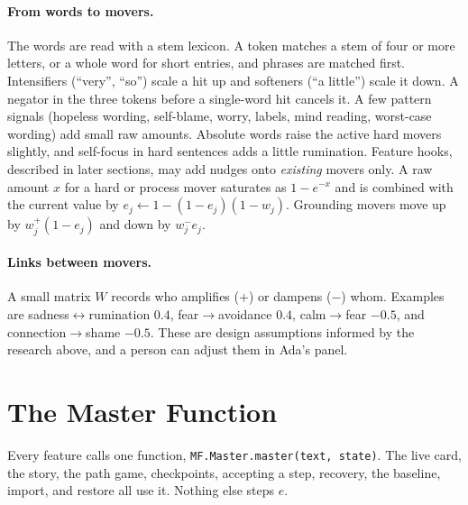 \documentclass[10pt]{article}
\theoremstyle{definition}
\theoremstyle{remark}
\begin{document}
\paragraph{From words to movers.} The words are read with a stem lexicon. A token matches a stem of four or more letters, or a whole word for short entries, and phrases are matched first. Intensifiers (``very'', ``so'') scale a hit up and softeners (``a little'') scale it down. A negator in the three tokens before a single-word hit cancels it. A few pattern signals (hopeless wording, self-blame, worry, labels, mind reading, worst-case wording) add small raw amounts. Absolute words raise the active hard movers slightly, and self-focus in hard sentences adds a little rumination. Feature hooks, described in later sections, may add nudges onto \emph{existing} movers only. A raw amount $x$ for a hard or process mover saturates as $1-e^{-x}$ and is combined with the current value by $e_j\leftarrow 1-(1-e_j)(1-w_j)$. Grounding movers move up by $w^{+}_j(1-e_j)$ and down by $w^{-}_j e_j$.

\paragraph{Links between movers.} A small matrix $W$ records who amplifies ($+$) or dampens ($-$) whom. Examples are sadness$\leftrightarrow$rumination $0.4$, fear$\to$avoidance $0.4$, calm$\to$fear $-0.5$, and connection$\to$shame $-0.5$. These are design assumptions informed by the research above, and a person can adjust them in Ada's panel.

\section{The Master Function}
\label{sec:master}
Every feature calls one function, \texttt{MF.Master.master(text, state)}. The live card, the story, the path game, checkpoints, accepting a step, recovery, the baseline, import, and restore all use it. Nothing else steps $e$.
\end{document}
